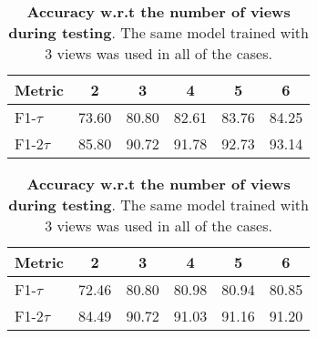 \begin{table}[ht]
\noindent \scriptsize \footnotesize
\begin{minipage}[t]{0.5\textwidth}
\centering
\begin{tabular}{ l | c c c c c }
    \hline
    Metric & 2 & 3 & 4 & 5 & 6\\
    \hline
    F1-$\tau$  & 73.60 & 80.80 & 82.61 & 83.76 & 84.25 \\
    F1-$2\tau$ & 85.80 & 90.72 & 91.78 & 92.73 & 93.14 \\
    \hline
\end{tabular}
\caption{
    \textbf{Accuracy w.r.t the number of views during training}.
    The evaluation was performed on the same number of views as training.
}
\label{table:number_of_input_views}
\end{minipage}
\hspace{0.1cm}
\noindent \scriptsize \footnotesize
\begin{minipage}[t]{0.5\textwidth}
\centering
\begin{tabular}{ l | c c c c c }
    \hline
    Metric & 2 & 3 & 4 & 5 & 6 \\
    \hline
    F1-$\tau$   & 72.46 & 80.80 & 80.98 & 80.94 & 80.85 \\
    F1-$2\tau$  & 84.49 & 90.72 & 91.03 & 91.16 & 91.20 \\
    \hline
\end{tabular}
\caption{
    \textbf{Accuracy w.r.t the number of views during testing}.
    The same model trained with 3 views was used in all of the cases.
}
\label{table:number_of_test_views}
\end{minipage}
\end{table}